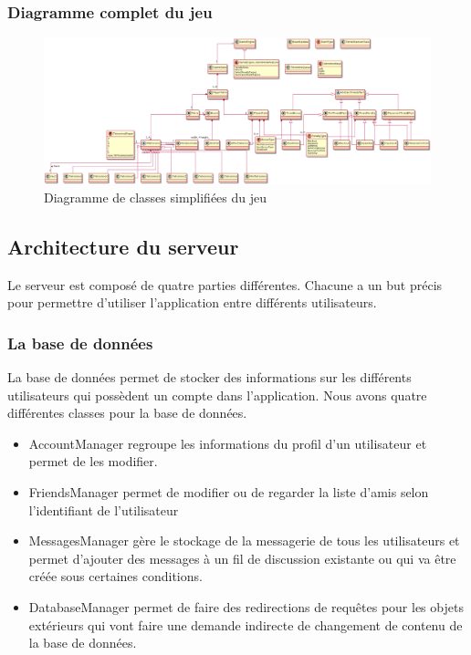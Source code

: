 \documentclass{article}
\begin{document}
\subsubsection{Diagramme complet du jeu}

\begin{figure}[H]
    \centering
    \includegraphics[scale=0.3, angle=90]{../res/uml/class/GameStructureClass.png}
    \caption{Diagramme de classes simplifiées du jeu}
    \label{fig:WholeGameDiagramm}
\end{figure}

\newpage


\subsection{Architecture du serveur}

Le serveur est composé de quatre parties différentes. Chacune a un but précis pour permettre d'utiliser l'application entre différents utilisateurs.

\subsubsection{La base de données}

La base de données permet de stocker des informations sur les différents utilisateurs qui possèdent un compte dans l'application. Nous avons quatre différentes classes pour la base de données. 
\begin{itemize}
	\item AccountManager regroupe les informations du profil d'un utilisateur et permet de les modifier.
	\item FriendsManager permet de modifier ou de regarder la liste d'amis selon l'identifiant de l'utilisateur
	\item MessagesManager gère le stockage de la messagerie de tous les utilisateurs et permet d'ajouter des messages à un fil de discussion existante ou qui va être créée sous certaines conditions. 
	\item DatabaseManager permet de faire des redirections de requêtes pour les objets extérieurs qui vont faire une demande indirecte de changement de contenu de la base de données.
\end{itemize}
\end{document}
